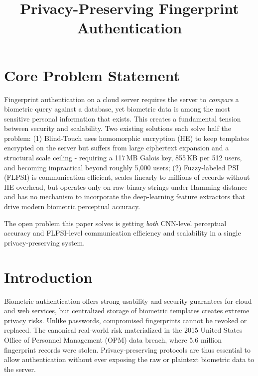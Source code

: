 \documentclass[11pt,a4paper]{article}
\title{
  \textbf{Privacy-Preserving Fingerprint Authentication}
  \\[0.5em]
  
}
\author{}
\date{}
\begin{document}
\maketitle

\section*{Core Problem Statement}


Fingerprint authentication on a cloud server requires the server to \emph{compare}
a biometric query against a database, yet biometric data is among the most
sensitive personal information that exists. This creates a fundamental tension between
security and scalability. Two existing solutions each solve half the problem:
(1) Blind-Touch uses homomorphic encryption (HE) to keep templates encrypted on the
server but suffers from large ciphertext expansion and a structural scale ceiling -
requiring a 117\,MB Galois key, 855\,KB per 512 users, and becoming impractical beyond roughly 5,000 users;
(2) Fuzzy-labeled PSI (FLPSI) is communication-efficient, scales linearly to millions of records without HE overhead,
but operates only on raw binary strings under Hamming distance and has no mechanism to incorporate the
deep-learning feature extractors that drive modern biometric perceptual accuracy.

The open problem this paper solves is getting \emph{both} CNN-level perceptual accuracy and FLPSI-level
communication efficiency and scalability in a single privacy-preserving system.

\section{Introduction}

Biometric authentication offers strong usability and security guarantees for cloud and web services, but centralized storage of biometric templates creates extreme privacy risks. Unlike passwords, compromised fingerprints cannot be revoked or replaced. The canonical real-world risk materialized in the 2015 United States Office of Personnel Management (OPM) data breach, where 5.6 million fingerprint records were stolen. Privacy-preserving protocols are thus essential to allow authentication without ever exposing the raw or plaintext biometric data to the server.
\end{document}
